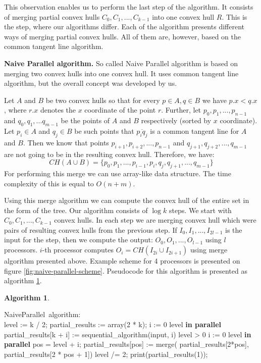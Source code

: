 \documentclass[letterpaper]{article}
\newcommand{\mypar}[1]{{\bf #1.}}
\theoremstyle{definition}
\newtheorem{algorithm}{Algorithm}
\begin{document}
This observation enables us to perform the last step of the algorithm.
It consists of merging partial convex hulls $C_0, C_1, ..., C_{k - 1}$ into one convex hull $R$.
This is the step, where our algorithms differ.
Each of the algorithm presents different ways of merging partial convex hulls.
All of them are, however, based on the common tangent line algorithm.

\mypar{Naive Parallel algorithm}
So called Naive Parallel algorithm is based on merging two convex hulls into one convex hull.
It uses common tangent line algorithm, but the overall concept was developed by us.

Let $A$ and $B$ be two convex hulls so that for every $p \in A, q \in B$ we have $p.x < q.x$, where $r.x$ denotes the $x$ coordinate of the point $r$.
Further, let $p_0, p_1, ..., p_{n-1}$ and $q_0, q_1, ... q_{m-1}$ be the points of $A$ and $B$ respectively (sorted by $x$ coordinate).
Let $p_i \in A$ and $q_j \in B$ be such points that $\overline{p_iq_j}$ is a common tangent line for $A$ and $B$.
Then we know that points $p_{i+1}, p_{i + 2}, ..., p_{n - 1}$ and $q_{j + 1}, q_{j + 2}, ..., q_{m - 1}$ are not going to be in the resulting convex hull.
Therefore, we have:
$$CH(A \cup B) = \{ p_0, p_1, ..., p_{i - 1}, p_i, q_j, q_{j + 1}, ..., q_{m - 1} \}$$
For performing this merge we can use array-like data structure.
The time complexity of this is equal to $O(n + m)$.

Using this merge algorithm we can compute the convex hull of the entire set in the form of the tree.
Our algorithm consists of $\log k$ steps.
We start with $C_0, C_1, ..., C_{k-1}$ convex hulls.
In each step we are merging convex hull which were pairs of resulting convex hulls from the previous step. 
If $I_0, I_1, ..., I_{2l - 1}$ is the input for the step, then we compute the output: $O_0, O_1, ..., O_{l - 1}$ using $l$ processors. 
$i$-th processor computes $O_i = CH(I_{2i} \cup I_{2i+1})$ using merge algorithm presented above.
Example scheme for 4 processors is presented on figure \ref{fig:naive-parallel-scheme}.
Pseudocode for this algorithm is presented as algorithm \ref{alg:naive-parallel}.

\begin{algorithm}
\label{alg:naive-parallel}
\begin{program}
\mbox{NaiveParallel algorithm:}
\BEGIN \\ %
  level := k / 2;
  partial\_results := array(2 * k);
  \FOR i := 0 \TO level  \textrm{\bf{\;in parallel}} \DO
    partial\_results[k + i] := 
    \;\;\;\; sequential\_algorithm(input, i)
  \OD
  \WHILE level > 0 \DO
    \FOR i := 0 \TO level  \textrm{\bf{\;in parallel}} \DO
      pos = level + i;
      partial\_results[pos] := merge(
      \;\;\;\; partial\_results[2*pos],
      \;\;\;\; partial\_results[2 * pos + 1])
    \OD
    level /= 2;
  \OD
  print(partial\_results(1));

\END
\end{program}
\end{algorithm}
\end{document}

